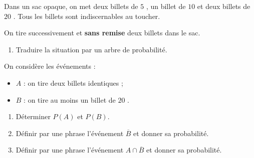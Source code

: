 \begin{exo}
	Dans un sac opaque, on met deux billets de $5$ \eur{}, un billet de $10$ \eur{} et deux billets de $20$ \eur{}. Tous les billets sont indiscernables au toucher.

	On tire successivement et \textbf{sans remise} deux billets dans le sac.

	\begin{enumerate}
		\item Traduire la situation par un arbre de probabilité.
	\end{enumerate}

	On considère les événements :
	\begin{itemize}
		\item $A$ : \og{} on tire deux billets identiques \fg{} ;
		\item $B$ : \og{} on tire au moins un billet de $20$ \eur{} \fg{}.
	\end{itemize}

	\begin{enumerate}[resume]
		\item Déterminer $P(A)$ et $P(B)$.
		\item Définir par une phrase l'événement $\overline{B}$ et donner sa probabilité.
		\item Définir par une phrase l'événement $A \cap \overline{B}$ et donner sa probabilité.
	\end{enumerate}
\end{exo}
